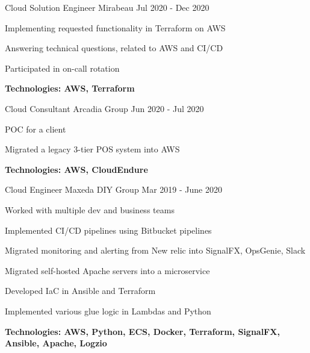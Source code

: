 \begin{cventries}
\hfill\begin{minipage}{\dimexpr\textwidth-1cm}
\xdef\tpd{\the\prevdepth}
\begin{cventrystack}
	\cventry
	{Cloud Solution Engineer} %
	{Mirabeau} %
	{} %
	{Jul 2020 - Dec 2020} %
	{
		\begin{cvitems}
			\item {Implementing requested functionality in Terraform on AWS}
			\item {Answering technical questions, related to AWS and CI/CD}
			\item {Participated in on-call rotation}
			\item {\bfseries{Technologies:} AWS, Terraform}
		\end{cvitems}
	}

	\cventry
	{Cloud Consultant} %
	{Arcadia Group} %
	{} %
	{Jun 2020 - Jul 2020} %
	{ %
		\begin{cvitems}
			\item {POC for a client}
			\item {Migrated a legacy 3-tier POS system into AWS}
			\item {\bfseries{Technologies:} AWS, CloudEndure}
		\end{cvitems}
	}

\end{cventrystack}
\end{minipage}

\hfill\begin{minipage}{\dimexpr\textwidth-1cm}
\xdef\tpd{\the\prevdepth}
\begin{cventrystack}

	\cventry
	{Cloud Engineer} %
	{Maxeda DIY Group} %
	{} %
	{Mar 2019 - June 2020} %
	{ %
		\begin{cvitems}
			\item {Worked with multiple dev and business teams}
			\item {Implemented CI/CD pipelines using Bitbucket pipelines}
			\item {Migrated monitoring and alerting from New relic into SignalFX, OpsGenie, Slack}
			\item {Migrated self-hosted Apache servers into a microservice}
			\item {Developed IaC in Ansible and Terraform}
			\item {Implemented various glue logic in Lambdas and Python}
			\item {\bfseries{Technologies:} AWS, Python, ECS, Docker, Terraform, SignalFX, Ansible, Apache, Logzio}
		\end{cvitems}
	}
\end{cventrystack}
\end{minipage}



\end{cventries}
